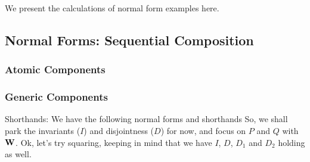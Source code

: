 We present the calculations of normal form examples here.

\subsection{Normal Forms: Sequential Composition}

\subsubsection{Atomic Components}

\subsubsection{Generic Components}

Shorthands:
We have the following normal forms and shorthands
So, we shall park the invariants ($I$) and disjointness ($D$) for now,
and focus on $P$ and $Q$ with $\mathbf{W}$.
Ok, let's try squaring, keeping in mind that we have $I$, $D$, $D_1$
and $D_2$ holding as well.






